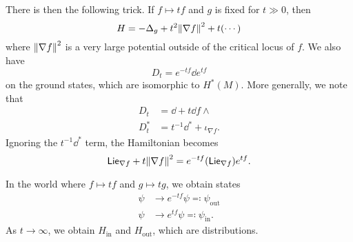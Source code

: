 \documentclass[leqno, openany]{memoir}
\theoremstyle{definition}
\theoremstyle{remark}
\theoremstyle{plain}
\theoremstyle{definition}
\theoremstyle{remark}
\newcommand{\mr}[1]{\mathrm{#1}}
\newcommand{\ms}[1]{\mathsf{#1}}
\begin{document}
There is then the following trick. If $f \mapsto t f$ and $g$ is fixed for $t \gg 0$, then
\[ H = -\Delta_g + t^2 \norm{\nabla f}^2 + t (\cdots) \]
where $\norm{\nabla f}^2$ is a very large potential outside of the critical locus of $f$. We also have
\[ D_t = e^{-tf} \dd{e^{tf}} \]
on the ground states, which are isomorphic to $H^*(M)$. More generally, we note that
\begin{align*}
    D_t &= \dd + t \dd{f} \wedge \\
    D_t^* &= t^{-1} \dd^* + \iota_{\nabla f}.
\end{align*}
Ignoring the $t^{-1} \dd^*$ term, the Hamiltonian becomes
\[ \ms{Lie}_{\nabla f} + t \norm{\nabla f}^2 = e^{-tf}(\ms{Lie}_{\nabla f})e^{tf}. \]

In the world where $f \mapsto tf$ and $g \mapsto tg$, we obtain states
\begin{align*}
    \psi &\to e^{-tf} \psi \eqqcolon \psi_{\mr{out}} \\
    \psi &\to e^{tf} \psi \eqqcolon \psi_{\mr{in}}.
\end{align*}
As $t \to \infty$, we obtain $H_{\mr{in}}$ and $H_{\mr{out}}$, which are distributions.
\end{document}
